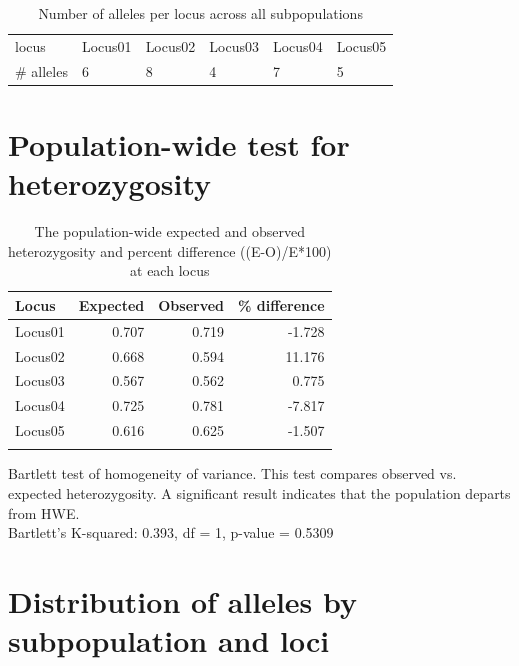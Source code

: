 \documentclass[a4paper]{scrartcl}\usepackage[]{graphicx}\usepackage[]{color}
\begin{document}
\begin{table}[ht]
\centering
\begin{tabular}{llllll}
   \hline
locus & Locus01 & Locus02 & Locus03 & Locus04 & Locus05 \\ 
   \rowcolor[gray]{0.9} \# alleles & 6 & 8 & 4 & 7 & 5 \\ 
   \hline
\end{tabular}
\caption{Number of alleles per locus across all subpopulations} 
\end{table}







\FloatBarrier
\section{Population-wide test for heterozygosity}

\noindent




\begin{table}[ht]
\centering
\begin{tabular}{lrrr}
  \hline
Locus & Expected & Observed & \% difference \\ 
  \hline
Locus01 & 0.707 & 0.719 & -1.728 \\ 
   \rowcolor[gray]{0.9} Locus02 & 0.668 & 0.594 & 11.176 \\ 
  Locus03 & 0.567 & 0.562 & 0.775 \\ 
   \rowcolor[gray]{0.9} Locus04 & 0.725 & 0.781 & -7.817 \\ 
  Locus05 & 0.616 & 0.625 & -1.507 \\ 
   \rowcolor[gray]{0.9}  \hline
\end{tabular}
\caption{The population-wide expected and observed heterozygosity and percent difference ((E-O)/E*100) at each locus} 
\end{table}

\noindent
Bartlett test of homogeneity of variance. This test compares observed vs. expected heterozygosity. A significant result indicates that the population departs from HWE. \\
Bartlett's K-squared: 0.393, df = 1, p-value = 0.5309



\FloatBarrier
\section{Distribution of alleles by subpopulation and loci}
\end{document}
